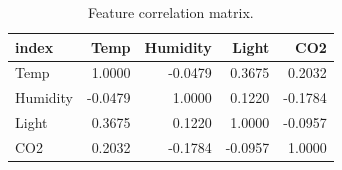 \begin{table}
\caption{Feature correlation matrix.}
\label{tab:corr}
\begin{tabular}{lrrrr}
\toprule
index & Temp & Humidity & Light & CO2 \\
\midrule
Temp & 1.0000 & -0.0479 & 0.3675 & 0.2032 \\
Humidity & -0.0479 & 1.0000 & 0.1220 & -0.1784 \\
Light & 0.3675 & 0.1220 & 1.0000 & -0.0957 \\
CO2 & 0.2032 & -0.1784 & -0.0957 & 1.0000 \\
\bottomrule
\end{tabular}
\end{table}
